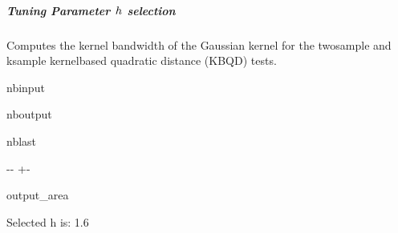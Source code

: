 \documentclass[letterpaper,10pt,english,openany,oneside]{sphinxmanual}
\begin{document}
\subparagraph{Tuning Parameter \protect\(h\protect\) selection}
\label{\detokenize{user_guide/basic_usage:Tuning-Parameter-h-selection}}
\sphinxAtStartPar
Computes the kernel bandwidth of the Gaussian kernel for the two\sphinxhyphen{}sample and ksample kernel\sphinxhyphen{}based quadratic distance (KBQD) tests.

\begin{sphinxuseclass}{nbinput}
{
\begin{sphinxVerbatim}[commandchars=\\\{\}]
\llap{\color{nbsphinxin}[17]:\,\hspace{\fboxrule}\hspace{\fboxsep}}   

   
    

    
         
 
\end{sphinxVerbatim}
}

\end{sphinxuseclass}
\begin{sphinxuseclass}{nboutput}
\begin{sphinxuseclass}{nblast}
{

\kern-\sphinxverbatimsmallskipamount\kern-\baselineskip
\kern+\FrameHeightAdjust\kern-\fboxrule
\vspace{\nbsphinxcodecellspacing}

\begin{sphinxuseclass}{output_area}
\begin{sphinxuseclass}{}


\begin{sphinxVerbatim}[commandchars=\\\{\}]
Selected h is:  1.6
\end{sphinxVerbatim}



\end{sphinxuseclass}
\end{sphinxuseclass}
}

\end{sphinxuseclass}
\end{sphinxuseclass}
\end{document}

